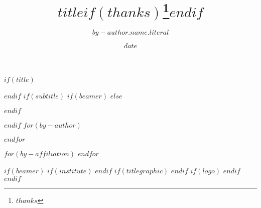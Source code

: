 $if(title)$
    \title{\vspace{-2cm}$title$$if(thanks)$\thanks{$thanks$}$endif$}
$endif$
$if(subtitle)$
    $if(beamer)$
    $else$
        \usepackage{etoolbox}
        \makeatletter
        \providecommand{\subtitle}[1]{%
        \apptocmd{\@title}{\par {\large #1 \par}}{}{}
        }
        \makeatother
    $endif$
    \subtitle{$subtitle$}
$endif$
$for(by-author)$
  \author[$for(by-author.affiliations)$$it.number$$sep$,$endfor$$if(by-author.email)$,\textdagger$endif$$if(by-author.equal-contributor)$,*$endif$]
  {$by-author.name.literal$}%
$endfor$

$for(by-affiliation)$
$endfor$

\date{$date$}
$if(beamer)$
    $if(institute)$
    $endif$
    $if(titlegraphic)$
    $endif$
    $if(logo)$
    $endif$
$endif$
